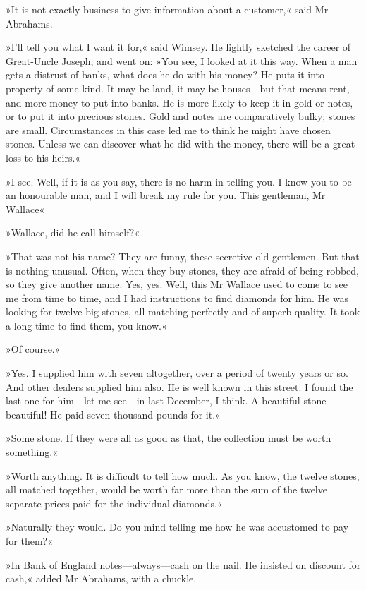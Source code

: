 »It is not exactly business to give information about a customer,« said Mr Abrahams.

»I'll tell you what I want it for,« said Wimsey. He lightly sketched the career of Great-Uncle Joseph, and went on: »You see, I looked at it this way. When a man gets a distrust of banks, what does he do with his money? He puts it into property of some kind. It may be land, it may be houses—but that means rent, and more money to put into banks. He is more likely to keep it in gold or notes, or to put it into precious stones. Gold and notes are comparatively bulky; stones are small. Circumstances in this case led me to think he might have chosen stones. Unless we can discover what he did with the money, there will be a great loss to his heirs.«

»I see. Well, if it is as you say, there is no harm in telling you. I know you to be an honourable man, and I will break my rule for you. This gentleman, Mr Wallace\longdash«

»Wallace, did he call himself?«

»That was not his name? They are funny, these secretive old gentlemen. But that is nothing unusual. Often, when they buy stones, they are afraid of being robbed, so they give another name. Yes, yes. Well, this Mr Wallace used to come to see me from time to time, and I had instructions to find diamonds for him. He was looking for twelve big stones, all matching perfectly and of superb quality. It took a long time to find them, you know.«

»Of course.«

»Yes. I supplied him with seven altogether, over a period of twenty years or so. And other dealers supplied him also. He is well known in this street. I found the last one for him—let me see—in last December, I think. A beautiful stone—beautiful! He paid seven thousand pounds for it.«

»Some stone. If they were all as good as that, the collection must be worth something.«

»Worth anything. It is difficult to tell how much. As you know, the twelve stones, all matched together, would be worth far more than the sum of the twelve separate prices paid for the individual diamonds.«

»Naturally they would. Do you mind telling me how he was accustomed to pay for them?«

»In Bank of England notes—always—cash on the nail. He insisted on discount for cash,« added Mr Abrahams, with a chuckle.

